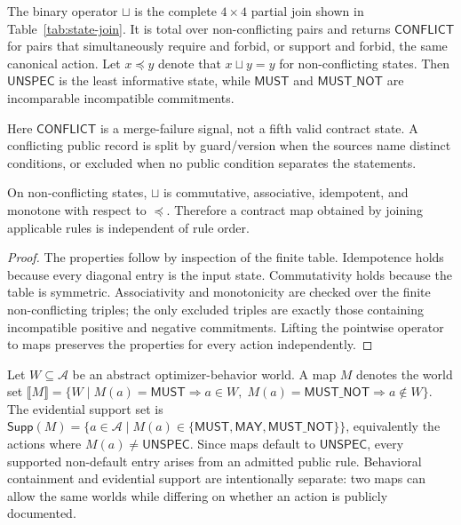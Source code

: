 

\begin{definition}
The binary operator $\sqcup$ is the complete $4\times4$ partial join shown in Table~\ref{tab:state-join}.  It is total over non-conflicting pairs and returns $\mathsf{CONFLICT}$ for pairs that simultaneously require and forbid, or support and forbid, the same canonical action.  Let $x\preceq y$ denote that $x\sqcup y=y$ for non-conflicting states.  Then $\mathsf{UNSPEC}$ is the least informative state, while $\mathsf{MUST}$ and $\mathsf{MUST\_NOT}$ are incomparable incompatible commitments.
\end{definition}
Here $\mathsf{CONFLICT}$ is a merge-failure signal, not a fifth valid contract state.  A conflicting public record is split by guard/version when the sources name distinct conditions, or excluded when no public condition separates the statements.

\begin{lemma}
On non-conflicting states, $\sqcup$ is commutative, associative, idempotent, and monotone with respect to $\preceq$.  Therefore a contract map obtained by joining applicable rules is independent of rule order.
\end{lemma}
\begin{proof}
The properties follow by inspection of the finite table.  Idempotence holds because every diagonal entry is the input state.  Commutativity holds because the table is symmetric.  Associativity and monotonicity are checked over the finite non-conflicting triples; the only excluded triples are exactly those containing incompatible positive and negative commitments.  Lifting the pointwise operator to maps preserves the properties for every action independently.
\end{proof}

Let $W\subseteq\mathcal{A}$ be an abstract optimizer-behavior world.  A map $M$ denotes the world set
$\llbracket M\rrbracket=\{W\mid M(a)=\mathsf{MUST}\Rightarrow a\in W,\; M(a)=\mathsf{MUST\_NOT}\Rightarrow a\notin W\}$.
The evidential support set is $\mathsf{Supp}(M)=\{a\in\mathcal{A}\mid M(a)\in\{\mathsf{MUST},\mathsf{MAY},\mathsf{MUST\_NOT}\}\}$, equivalently the actions where $M(a)\ne\mathsf{UNSPEC}$.  Since maps default to $\mathsf{UNSPEC}$, every supported non-default entry arises from an admitted public rule.  Behavioral containment and evidential support are intentionally separate: two maps can allow the same worlds while differing on whether an action is publicly documented.

